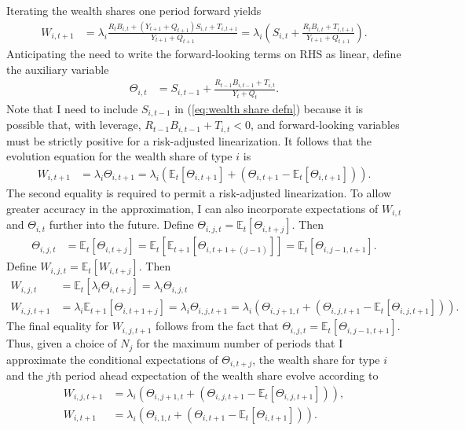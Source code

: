 \documentclass[12 pt, oneside]{article}
\theoremstyle{definition}
\theoremstyle{definition}
\theoremstyle{definition}
\newcommand{\E}{\mathbb{E}}
\begin{document}
Iterating the wealth shares one period forward yields
\begin{align*}
  W_{i, t + 1} & = \lambda_i\frac{R_tB_{i, t} + (Y_{t + 1} + Q_{t + 1}) S_{i, t} + T_{i, t + 1}}{Y_{t + 1} + Q_{t + 1}} = \lambda_i\left(S_{i, t} + \frac{R_tB_{i, t} + T_{i, t + 1}}{Y_{t + 1} +  Q_{t + 1}}\right).
\end{align*}
Anticipating the need to write the forward-looking terms on RHS as linear, define the auxiliary variable
\begin{align}\label{eq:wealth share auxiliary defn}
  \Theta_{i, t} & = S_{i, t - 1} + \frac{R_{t - 1}B_{i, t - 1} + T_{i, t}}{Y_t +  Q_t}.
\end{align}
Note that I need to include $S_{i, t - 1}$ in (\ref{eq:wealth share defn}) because it is possible that, with leverage, $R_{t - 1} B_{i, t - 1} + T_{i, t} < 0$, and forward-looking variables must be strictly positive for a risk-adjusted linearization. It follows that the evolution equation for the wealth share of type $i$ is
\begin{align*}
  W_{i, t + 1} & = \lambda_i \Theta_{i, t + 1} = \lambda_i(\E_t[\Theta_{i, t + 1}] + (\Theta_{i, t + 1} - \E_t[\Theta_{i, t + 1}])).
\end{align*}
The second equality is required to permit a risk-adjusted linearization. To allow greater accuracy in the approximation, I can also incorporate
expectations of $W_{i, t}$ and $\Theta_{i, t}$ further into the future. Define $\Theta_{i, j, t} = \E_t[\Theta_{i, t + j}]$. Then
\begin{align*}
  \Theta_{i, j, t} & = \E_t[\Theta_{i, t + j}] = \E_t[\E_{t + 1}[\Theta_{i, t + 1 + (j - 1)}]] = \E_t[\Theta_{i, j - 1, t + 1}].
\end{align*}
Define $W_{i, j, t} = \E_t[W_{i, t + j}]$. Then
\begin{align*}
  W_{i, j, t} & = \E_t[\lambda_i\Theta_{i, t + j}] = \lambda_i\Theta_{i, j, t}\\
  W_{i, j, t + 1} & = \lambda_i\E_{t + 1}[\Theta_{i, t + 1 + j}] = \lambda_i\Theta_{i, j, t + 1} = \lambda_i(\Theta_{i, j + 1, t} + (\Theta_{i, j, t + 1} - \E_t[\Theta_{i, j, t + 1}])).
\end{align*}
The final equality for $W_{i, j, t + 1}$ follows from the fact that $\Theta_{i, j, t} = \E_t[\Theta_{i, j - 1, t + 1}]$.
Thus, given a choice of $N_j$ for the maximum number of periods that I approximate the conditional expectations of $\Theta_{i, t + j}$, the wealth share for type $i$ and the $j$th period ahead expectation of the wealth share evolve according to
\begin{align}
  \label{eq:wealth share cond expectation j period defn}
  W_{i, j, t + 1} & = \lambda_i(\Theta_{i, j + 1, t} + (\Theta_{i, j, t + 1} - \E_t[\Theta_{i, j, t + 1}])),\\
  \label{eq:wealth share evolution}
  W_{i, t + 1} & = \lambda_i(\Theta_{i, 1, t} + (\Theta_{i, t + 1} - \E_t[\Theta_{i, t + 1}])).
\end{align}
\end{document}
